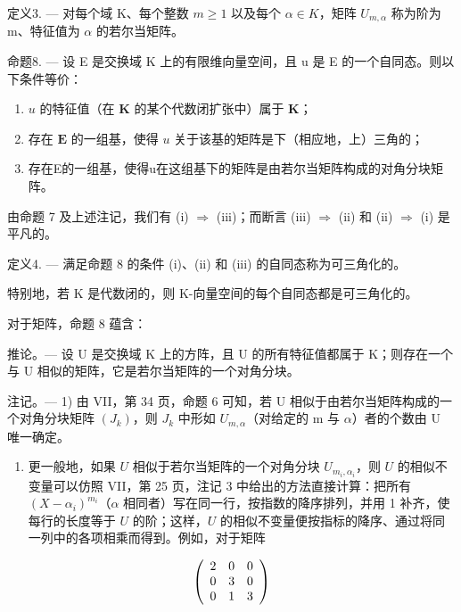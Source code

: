 定义3. --- 对每个域 K、每个整数 \(m \geqslant 1\) 以及每个 \(\alpha \in K\)，矩阵 \(U_{m,\alpha}\) 称为阶为 m、特征值为 \(\alpha\) 的若尔当矩阵。

命题8. --- 设 E 是交换域 K 上的有限维向量空间，且 u 是 E 的一个自同态。则以下条件等价：

\begin{enumerate}
\def\labelenumi{(\roman{enumi})}
\item
  \(u\) 的特征值（在 \(\mathbf{K}\) 的某个代数闭扩张中）属于 \(\mathbf{K}\)；
\item
  存在 \(\mathbf{E}\) 的一组基，使得 \(u\) 关于该基的矩阵是下（相应地，上）三角的；
\item
  存在E的一组基，使得u在这组基下的矩阵是由若尔当矩阵构成的对角分块矩阵。
\end{enumerate}

由命题 7 及上述注记，我们有 (i) \(\Rightarrow\) (iii)；而断言 (iii) \(\Rightarrow\) (ii) 和 (ii) \(\Rightarrow\) (i) 是平凡的。

定义4. --- 满足命题 8 的条件 (i)、(ii) 和 (iii) 的自同态称为可三角化的。

特别地，若 K 是代数闭的，则 K-向量空间的每个自同态都是可三角化的。

对于矩阵，命题 8 蕴含：

推论。--- 设 U 是交换域 K 上的方阵，且 U 的所有特征值都属于 K；则存在一个与 U 相似的矩阵，它是若尔当矩阵的一个对角分块。

注记。--- 1) 由 VII，第 34 页，命题 6 可知，若 U 相似于由若尔当矩阵构成的一个对角分块矩阵 \((J_{k})\)，则 \(J_{k}\) 中形如 \(U_{m,\alpha}\)（对给定的 m 与 \(\alpha\)）者的个数由 U 唯一确定。

\begin{enumerate}
\def\labelenumi{\arabic{enumi})}
\setcounter{enumi}{1}
\tightlist
\item
  更一般地，如果 \(U\) 相似于若尔当矩阵的一个对角分块 \(U_{m_i,\alpha_i}\)，则 \(U\) 的相似不变量可以仿照 VII，第 25 页，注记 3 中给出的方法直接计算：把所有 \((X - \alpha_i)^{m_i}\)（\(\alpha\) 相同者）写在同一行，按指数的降序排列，并用 1 补齐，使每行的长度等于 \(U\) 的阶；这样，\(U\) 的相似不变量便按指标的降序、通过将同一列中的各项相乘而得到。例如，对于矩阵
\end{enumerate}

\[
\left( \begin{array}{c c c} 2 & 0 & 0 \\ 0 & 3 & 0 \\ 0 & 1 & 3 \end{array} \right)
\]

